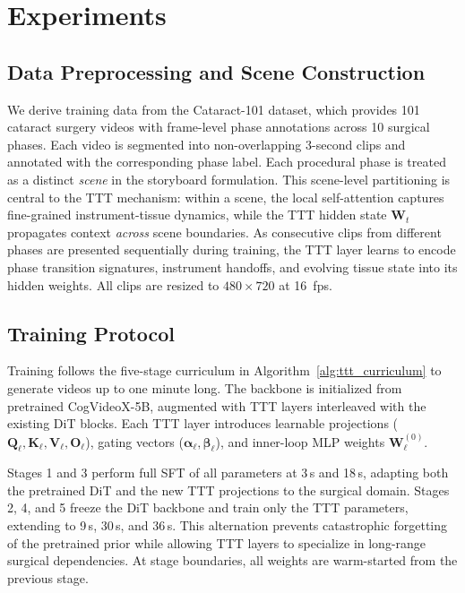 \documentclass[runningheads]{llncs}
\begin{document}
\section{Experiments}

\subsection{Data Preprocessing and Scene Construction}

We derive training data from the Cataract-101 dataset, which provides 101 cataract surgery videos with frame-level phase annotations across 10 surgical phases. Each video is segmented into non-overlapping 3-second clips and annotated with the corresponding phase label. Each procedural phase is treated as a distinct \textit{scene} in the storyboard formulation. This scene-level partitioning is central to the TTT mechanism: within a scene, the local self-attention captures fine-grained instrument-tissue dynamics, while the TTT hidden state $\mathbf{W}_t$ propagates context \textit{across} scene boundaries. As consecutive clips from different phases are presented sequentially during training, the TTT layer learns to encode phase transition signatures, instrument handoffs, and evolving tissue state into its hidden weights. All clips are resized to $480 \times 720$ at 16~fps.

\subsection{Training Protocol}

Training follows the five-stage curriculum in Algorithm~\ref{alg:ttt_curriculum} to generate videos up to one minute long. The backbone is initialized from pretrained CogVideoX-5B, augmented with TTT layers interleaved with the existing DiT blocks. Each TTT layer introduces learnable projections ($\mathbf{Q}_\ell, \mathbf{K}_\ell, \mathbf{V}_\ell, \mathbf{O}_\ell$), gating vectors ($\bm{\alpha}_\ell, \bm{\beta}_\ell$), and inner-loop MLP weights $\mathbf{W}_\ell^{(0)}$.

Stages 1 and 3 perform full SFT of all parameters at 3\,s and 18\,s, adapting both the pretrained DiT and the new TTT projections to the surgical domain. Stages 2, 4, and 5 freeze the DiT backbone and train only the TTT parameters, extending to 9\,s, 30\,s, and 36\,s. This alternation prevents catastrophic forgetting of the pretrained prior while allowing TTT layers to specialize in long-range surgical dependencies. At stage boundaries, all weights are warm-started from the previous stage.
\end{document}
